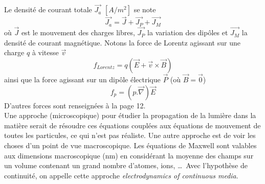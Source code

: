 Le densité de courant totale $\vec{J_a}$ $[A/m^2]$ se note
\begin{equation}
\vec{J_a} = \vec J + \vec{J_P}+\vec{J_M}
\end{equation}
où $\vec{J}$ est le mouvement des charges libres, $\vec{J_P}$ la variation des dipôles et 
$\vec{J_M}$ la densité de courant magnétique. Notons la force de Lorentz agissant sur une 
charge $q$ à vitesse $\vec{v}$
\begin{equation}
f_{Lorentz} = q(\vec{E}+\vec{v}\times\vec{B})
\end{equation}
ainsi que la force agissant sur un dipôle électrique $\vec{P}$ (où $\vec{B}=\vec0$)
\begin{equation}
f_p = (p.\vec{\nabla})\vec{E}
\end{equation}
D'autres forces sont renseignées à la page 12.\\

Une approche (microscopique) pour étudier la propagation de la lumière dans la matière serait 
de résoudre ces équations couplées aux équations de mouvement de toutes les particules, ce qui 
n'est pas réaliste. Une autre approche est de voir les choses d'un point de vue macroscopique. 
Les équations de Maxwell sont valables aux dimensions macroscopique (nm) en considérant la moyenne
des champs sur un volume contenant un grand nombre d'atomes, ions, \dots\ Avec l'hypothèse de
continuité, on appelle cette approche \textit{electrodynamics of continuous media}.




